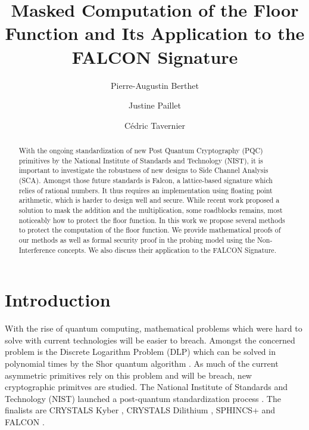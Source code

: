 \documentclass[runningheads]{llncs}
\begin{document}
%
\title{Masked Computation of the Floor Function and Its Application to the FALCON Signature}
%
%
\author{Pierre-Augustin Berthet \and
Justine Paillet \and
C\'edric Tavernier}
%
%
%
\maketitle              %
%
\begin{abstract}
With the ongoing standardization of new Post Quantum Cryptography (PQC) primitives by the National Institute of Standards and Technology (NIST), it is important to investigate the robustness of new designs to Side Channel Analysis (SCA). Amongst those future standards is Falcon, a lattice-based signature which relies of rational numbers. It thus requires an implementation using floating point arithmetic, which is harder to design well and secure. While recent work proposed a solution to mask the addition and the multiplication, some roadblocks remains, most noticeably how to protect the floor function. In this work we propose several methods to protect the computation of the floor function. We provide mathematical proofs of our methods as well as formal security proof in the probing model using the Non-Interference concepts. We also discuss their application to the FALCON Signature.

\end{abstract}
%
%
%
\section{Introduction}
With the rise of quantum computing, mathematical problems which were hard to solve with current technologies will be easier to breach. Amongst the concerned problem is the Discrete Logarithm Problem (DLP) which can be solved in polynomial times by the Shor quantum algorithm \cite{doi:10.1137/S0036144598347011}. As much of the current asymmetric primitives rely on this problem and will be breach, new cryptographic primitves are studied. The National Institute of Standards and Technology (NIST) launched a post-quantum standardization process \cite{chen2016report}. The finalists are CRYSTALS Kyber \cite{8406610,nistfips203mlkem}, CRYSTALS Dilithium \cite{Ducas_Kiltz_Lepoint_Lyubashevsky_Schwabe_Seiler_Stehlé_2018,nistfips204mldsa}, SPHINCS+ \cite{10.1145/3319535.3363229,nistfips205shdsa} and FALCON \cite{prest2020falcon}.
\end{document}
